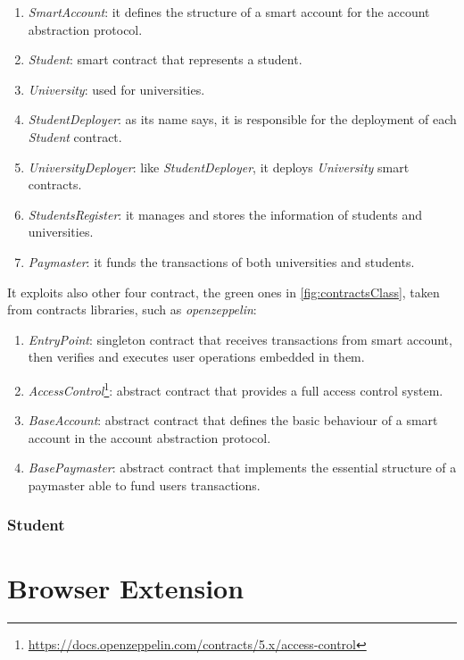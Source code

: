 \begin{enumerate}
    \item \textit{SmartAccount}: it defines the structure of a smart account for the account abstraction protocol.
    \item \textit{Student}: smart contract that represents a student.
    \item \textit{University}: used for universities.
    \item \textit{StudentDeployer}: as its name says, it is responsible for the deployment of each \textit{Student} contract.
    \item \textit{UniversityDeployer}: like \textit{StudentDeployer}, it deploys \textit{University} smart contracts.
    \item \textit{StudentsRegister}: it manages and stores the information of students and universities.
    \item \textit{Paymaster}: it funds the transactions of both universities and students.
\end{enumerate}
It exploits also other four contract, the green ones in \cref{fig:contractsClass}, taken from contracts libraries, such as \textit{openzeppelin}:
\begin{enumerate}
    \item \textit{EntryPoint}: singleton contract that receives transactions from smart account, then verifies and executes user operations embedded in them.
    \item \textit{AccessControl}\footnote{\url{https://docs.openzeppelin.com/contracts/5.x/access-control}}: abstract contract that provides a full access control system.
    \item \textit{BaseAccount}: abstract contract that defines the basic behaviour of a smart account in the account abstraction protocol.
    \item \textit{BasePaymaster}: abstract contract that implements the essential structure of a paymaster able to fund users transactions.  
\end{enumerate}


\subsubsection{Student}
\label{sssec:studentContract}

\section{Browser Extension}
\label{sec:browserExtensionDesign}

